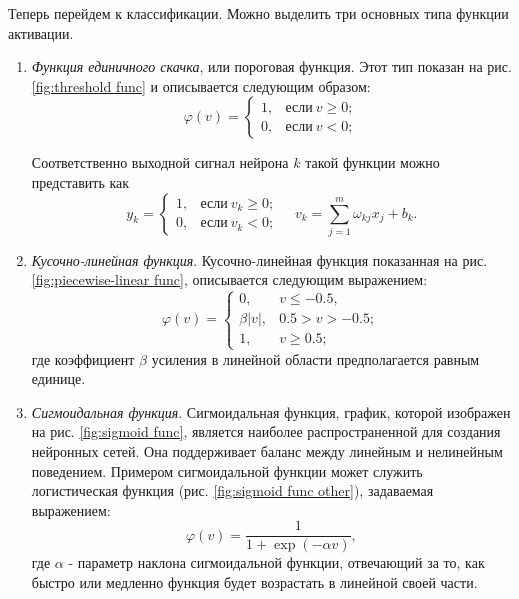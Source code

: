 \documentclass[a4paper,12pt]{report}
\begin{document}
Теперь перейдем к классификации. Можно выделить три основных типа функции
активации.

\begin{enumerate}
    \item \textit{Функция единичного скачка}, или пороговая функция.
        Этот тип показан на рис. \ref{fig:threshold func} и описывается следующим образом:
        \begin{equation}
            \varphi(v) =
            \begin{cases}
                1,& \text{если}\ v \geq 0; \\
                0,& \text{если}\ v < 0;
            \end{cases}
        \end{equation}

    Соответственно выходной сигнал нейрона $k$ такой функции можно
    представить как
        \begin{equation}
                y_k =
                \begin{cases}
                    1,& \text{если}\ v_k \geq 0; \\
                    0,& \text{если}\ v_k < 0;
                \end{cases}\quad
                v_k = \sum^{m}_{j=1}{\omega_{kj}x_j + b_k.}
        \end{equation}

    \item \textit{Кусочно-линейная функция}. Кусочно-линейная функция
        показанная на рис. \ref{fig:piecewise-linear func},
        описывается следующим выражением:
        \begin{equation}
            \varphi(v) =
                \begin{cases}
                    0    ,& v \leq -0.5, \\
                    \beta|v| ,& 0.5 > v > -0.5; \\
                    1    ,& v \geq 0.5;
                \end{cases}
        \end{equation}
        где коэффициент $\beta$ усиления в линейной области предполагается
        равным единице.

    \item \textit{Сигмоидальная функция}. Сигмоидальная функция,
        график, которой изображен на рис. \ref{fig:sigmoid func},
        является наиболее распространенной для создания нейронных
        сетей. Она поддерживает баланс между линейным и нелинейным
        поведением. Примером сигмоидальной функции может служить
        логистическая функция (рис. \ref{fig:sigmoid func other}), задаваемая выражением:
        \begin{equation}
        \varphi(v) = \frac{1}{1+\exp(-\alpha v)},
        \end{equation}
        где $\alpha$ - параметр наклона сигмоидальной функции,
        отвечающий за то, как быстро или медленно функция будет
        возрастать в линейной своей части.

\end{enumerate}
\end{document}
